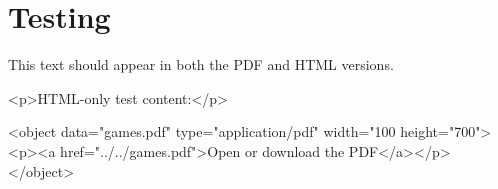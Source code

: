 \documentclass[12pt,letterpaper]{book}
\begin{document}
\tableofcontents

\chapter{Testing}

This text should appear in both the PDF and HTML versions.

\begin{latexonly}

\end{latexonly}

\begin{htmlonly}
\begin{rawhtml}
<p>HTML-only test content:</p>

<object data="games.pdf"
        type="application/pdf"
        width="100%
        height="700">
  <p><a href="../../games.pdf">Open or download the PDF</a></p>
</object>
\end{rawhtml}
\end{htmlonly}
\end{document}
